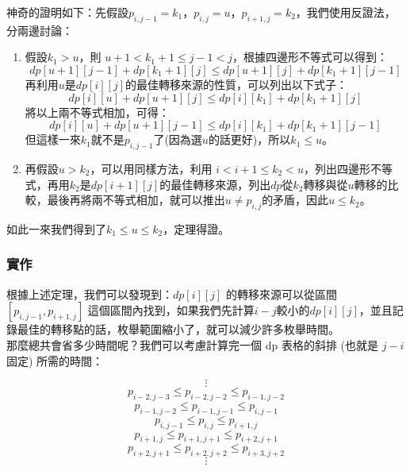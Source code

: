 	神奇的證明如下：先假設$p_{i, j-1} = k_1$，$p_{i, j} = u$，$p_{i+1, j} = k_2$，我們使用反證法，分兩邊討論：
	
	\begin{enumerate}
		\item 假設$k_1 > u$，則 $u+1 < k_1+1 \leq j-1 < j $，根據四邊形不等式可以得到：
		\begin{displaymath}
		dp[u+1][j-1] + dp[k_1+1][j] \leq dp[u+1][j] + dp[k_1+1][j-1]
		\end{displaymath}
		再利用$u$是$dp[i][j]$的最佳轉移來源的性質，可以列出以下式子：
		\begin{displaymath}
		dp[i][u] + dp[u+1][j] \leq dp[i][k_1] + dp[k_1+1][j]
		\end{displaymath}
		將以上兩不等式相加，可得：
		\begin{displaymath}
		dp[i][u] + dp[u+1][j-1] \leq dp[i][k_1] + dp[k_1+1][j-1]
		\end{displaymath}
		但這樣一來$k_1$就不是$p_{i, j-1}$了(因為選$u$的話更好)，所以$k_1 \leq u$。
		
		\item 再假設$u > k_2$，可以用同樣方法，利用 $i < i+1 \leq k_2 < u $，列出四邊形不等式，再用$k_2$是$dp[i+1][j]$的最佳轉移來源，列出$dp$從$k_2$轉移與從$u$轉移的比較，最後再將兩不等式相加，就可以推出$u \neq p_{i, j}$的矛盾，因此$u \leq k_2$。
	\end{enumerate}
	
	如此一來我們得到了$k_1 \leq u \leq k_2$，定理得證。
	
	\subsubsection{實作}
	
	根據上述定理，我們可以發現到：$dp[i][j]$ 的轉移來源可以從區間 $[p_{i,j−1}, p_{i+1,j} ]$ 這個區間內找到，如果我們先計算$i-j$較小的$dp[i][j]$，並且記錄最佳的轉移點的話，枚舉範圍縮小了，就可以減少許多枚舉時間。\\
	
	那麼總共會省多少時間呢？我們可以考慮計算完一個 dp 表格的斜排 (也就是 $j - i$ 固定) 所需的時間：
	
	\begin{displaymath}
	\vdots
	\end{displaymath}
	\begin{displaymath}
	p_{i−2,j−3} \leq p_{i−2,j−2} \leq p_{i−1,j−2}
	\end{displaymath}
	\begin{displaymath}
	p_{i−1,j−2} \leq p_{i−1,j−1} \leq p_{i,j−1}
	\end{displaymath}
	\begin{displaymath}
	p_{i,j−1} \leq p_{i,j} \leq p_{i+1,j}
	\end{displaymath}
	\begin{displaymath}
	p_{i+1,j} \leq p_{i+1,j+1} \leq p_{i+2,j+1}
	\end{displaymath}
	\begin{displaymath}
	p_{i+2,j+1} \leq p_{i+2,j+2} \leq p_{i+3,j+2}
	\end{displaymath}
	\begin{displaymath}
	\vdots
	\end{displaymath}
	
